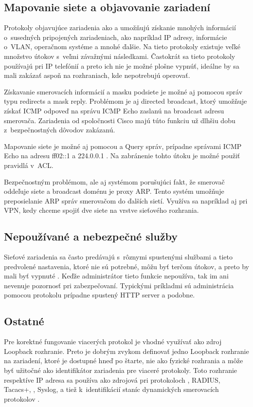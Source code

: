\subsection*{Mapovanie siete a objavovanie zariadení}
Protokoly objavujúce zariadenia ako  a  umožňujú získanie mnohých informácií o~susedných pripojených zariadeniach, ako napríklad IP adresy, informácie o~VLAN, operačnom systéme a mnohé ďalšie. Na tieto protokoly existuje veľké množstvo útokov s~veľmi závažnými následkami. Častokrát sa tieto protokoly používajú pri IP telefónií a preto ich nie je možné plošne vypnúť, ideálne by sa mali zakázať aspoň na rozhraniach, kde nepotrebujú operovať. 

Získavanie smerovacích informácií a masku podsiete je možné aj pomocou správ  typu redirects a mask reply. Problémom je aj directed broadcast, ktorý umožňuje získať ICMP odpoveď na správu ICMP Echo zaslanú na broadcast adresu smerovača. Zariadenia od spoločnosti Cisco majú túto funkciu už dlhšiu dobu z~bezpečnostných dôvodov zakázanú. 

Mapovanie siete je možné aj pomocou  a  Query správ, prípadne správami ICMP Echo na adresu ff02::1 a 224.0.0.1 \cite{Rey2016}\cite{Podermanski532015}. Na zabránenie tohto útoku je možné použiť pravidlá v~ACL. 

Bezpečnostným problémom, ale aj systémom porušujúci fakt, že smerovač oddeľuje siete a broadcast doménu je proxy ARP. Tento systém umožňuje preposielanie ARP správ smerovačom do ďalších sietí. Využíva sa napríklad aj pri VPN, kedy chceme spojiť dve siete na vrstve sieťového rozhrania. 

\subsection*{Nepoužívané a nebezpečné služby}
Sieťové zariadenia sa často predávajú s~rôznymi spustenými službami a tieto predvolené nastavenia, ktoré nie sú potrebné, môžu byť terčom útokov, a preto by mali byť vypnuté \cite{CIS_DrTLsgXv24lxeIIM}. Keďže administrátor tieto funkcie nepoužíva, tak im ani nevenuje pozornosť pri zabezpečovaní. Typickými príkladmi sú administrácia pomocou protokolu  prípadne spustený HTTP server a podobne. 

\subsection*{Ostatné}
Pre korektné fungovanie viacerých protokol je vhodné využívať ako zdroj Loopback rozhranie. Preto je dobrým zvykom definovať jedno Loopback rozhranie na zariadení, ktoré je dostupné hneď po štarte, nie ako fyzické rozhrania a môže byť užitočné ako identifikátor zariadenia pre viaceré protokoly. Toto rozhranie respektíve IP adresa sa používa ako zdrojová pri protokoloch , RADIUS, Tacacs+, , Syslog,  a tiež k~identifikácií staníc dynamických smerovacích protokolov \cite{Jackson2010} \cite{Singh2018} \cite{CIS_DrTLsgXv24lxeIIM}.
